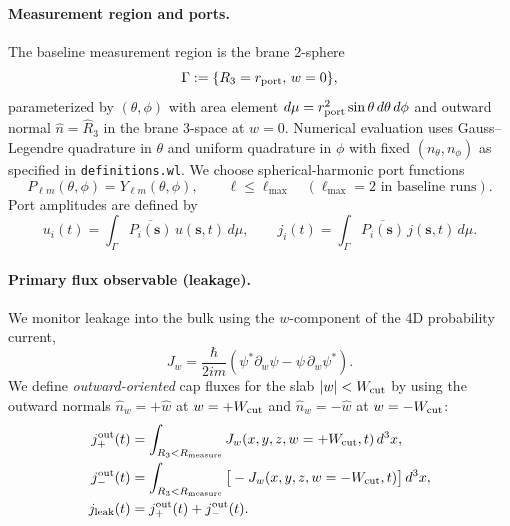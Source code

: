 \paragraph{Measurement region and ports.}
The baseline measurement region is the brane 2-sphere
\begin{equation}
\Gamma := \{R_3=r_{\rm port},\, w=0\},
\end{equation}
parameterized by $(\theta,\phi)$ with area element $d\mu=r_{\rm port}^2\sin\theta\,d\theta\,d\phi$ and outward normal $\hat n=\hat R_3$ in the brane 3-space at $w=0$.
Numerical evaluation uses Gauss--Legendre quadrature in $\theta$ and uniform quadrature in $\phi$ with fixed $(n_\theta,n_\phi)$ as specified in \texttt{definitions.wl}.
We choose spherical-harmonic port functions
\begin{equation}
P_{\ell m}(\theta,\phi)=Y_{\ell m}(\theta,\phi),\qquad \ell\le \ell_{\max}\quad (\ell_{\max}=2\text{ in baseline runs}).
\end{equation}
Port amplitudes are defined by
\begin{equation}
u_i(t)=\int_{\Gamma} \overline{P_i(\mathbf s)}\,u(\mathbf s,t)\,d\mu,\qquad
j_i(t)=\int_{\Gamma} \overline{P_i(\mathbf s)}\,j(\mathbf s,t)\,d\mu.
\end{equation}

\paragraph{Primary flux observable (leakage).}
We monitor leakage into the bulk using the $w$-component of the 4D probability current,
\begin{equation}
J_w=\frac{\hbar}{2im}\left(\psi^*\partial_w\psi-\psi\,\partial_w\psi^*\right).
\end{equation}
We define \emph{outward-oriented} cap fluxes for the slab $|w|<W_{\rm cut}$ by using the outward normals
$\hat n_w=+\hat w$ at $w=+W_{\rm cut}$ and $\hat n_w=-\hat w$ at $w=-W_{\rm cut}$:
\begin{align}
j^{\rm out}_{+}(t) &= \int_{R_3<R_{\rm measure}} J_w(x,y,z,w=+W_{\rm cut},t)\,d^3x,\\
j^{\rm out}_{-}(t) &= \int_{R_3<R_{\rm measure}} \big[-J_w(x,y,z,w=-W_{\rm cut},t)\big]\,d^3x,\\
j_{\rm leak}(t) &= j^{\rm out}_{+}(t)+j^{\rm out}_{-}(t).
\end{align}

